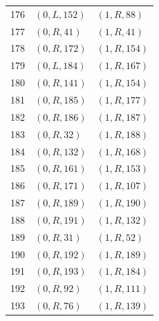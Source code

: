 \begin{longtable}{@{}rll@{}}
176 & $(0,L,152)$ & $(1,R,88)$\\
177 & $(0,R,41)$ & $(1,R,41)$\\
178 & $(0,R,172)$ & $(1,R,154)$\\
179 & $(0,L,184)$ & $(1,R,167)$\\
180 & $(0,R,141)$ & $(1,R,154)$\\
181 & $(0,R,185)$ & $(1,R,177)$\\
182 & $(0,R,186)$ & $(1,R,187)$\\
183 & $(0,R,32)$ & $(1,R,188)$\\
184 & $(0,R,132)$ & $(1,R,168)$\\
185 & $(0,R,161)$ & $(1,R,153)$\\
186 & $(0,R,171)$ & $(1,R,107)$\\
187 & $(0,R,189)$ & $(1,R,190)$\\
188 & $(0,R,191)$ & $(1,R,132)$\\
189 & $(0,R,31)$ & $(1,R,52)$\\
190 & $(0,R,192)$ & $(1,R,189)$\\
191 & $(0,R,193)$ & $(1,R,184)$\\
192 & $(0,R,92)$ & $(1,R,111)$\\
193 & $(0,R,76)$ & $(1,R,139)$\\
\end{longtable}
\endgroup
\clearpage
